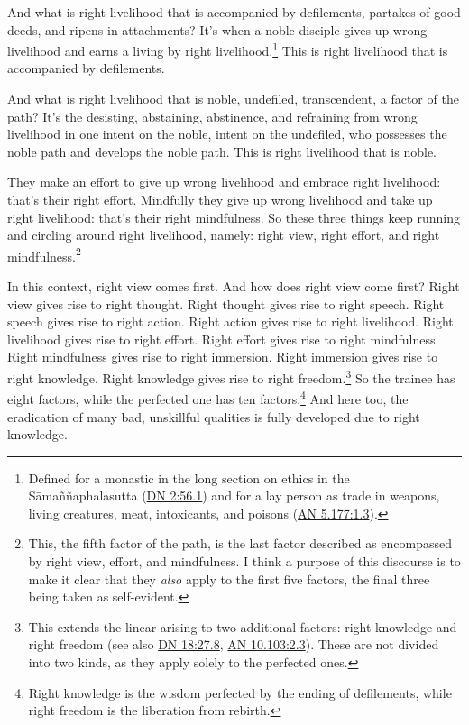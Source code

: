 \documentclass[12pt,openany]{book}%
\begin{document}
And what is right livelihood that is accompanied by defilements, partakes of good deeds, and ripens in attachments? It’s when a noble disciple gives up wrong livelihood and earns a living by right livelihood.\footnote{Defined for a monastic in the long section on ethics in the \textsanskrit{Sāmaññaphalasutta} (\href{https://suttacentral.net/dn2/en/sujato\#56.1}{DN 2:56.1}) and for a lay person as trade in weapons, living creatures, meat, intoxicants, and poisons (\href{https://suttacentral.net/an5.177/en/sujato\#1.3}{AN 5.177:1.3}). } This is right livelihood that is accompanied by defilements. 

And what is right livelihood that is noble, undefiled, transcendent, a factor of the path? It’s the desisting, abstaining, abstinence, and refraining from wrong livelihood in one intent on the noble, intent on the undefiled, who possesses the noble path and develops the noble path. This is right livelihood that is noble. 

They make an effort to give up wrong livelihood and embrace right livelihood: that’s their right effort. Mindfully they give up wrong livelihood and take up right livelihood: that’s their right mindfulness. So these three things keep running and circling around right livelihood, namely: right view, right effort, and right mindfulness.\footnote{This, the fifth factor of the path, is the last factor described as encompassed by right view, effort, and mindfulness. I think a purpose of this discourse is to make it clear that they \emph{also} apply to the first five factors, the final three being taken as self-evident. } 

In this context, right view comes first. And how does right view come first? Right view gives rise to right thought. Right thought gives rise to right speech. Right speech gives rise to right action. Right action gives rise to right livelihood. Right livelihood gives rise to right effort. Right effort gives rise to right mindfulness. Right mindfulness gives rise to right immersion. Right immersion gives rise to right knowledge. Right knowledge gives rise to right freedom.\footnote{This extends the linear arising to two additional factors: right knowledge and right freedom (see also \href{https://suttacentral.net/dn18/en/sujato\#27.8}{DN 18:27.8}, \href{https://suttacentral.net/an10.103/en/sujato\#2.3}{AN 10.103:2.3}). These are not divided into two kinds, as they apply solely to the perfected ones. } So the trainee has eight factors, while the perfected one has ten factors.\footnote{Right knowledge is the wisdom perfected by the ending of defilements, while right freedom is the liberation from rebirth. } And here too, the eradication of many bad, unskillful qualities is fully developed due to right knowledge. 
\end{document}
